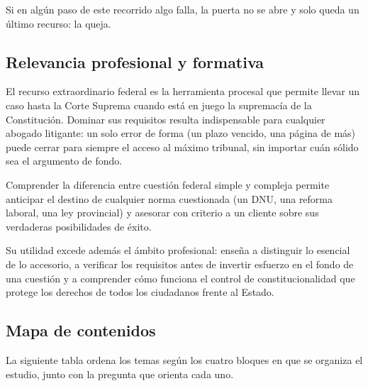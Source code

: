 \documentclass[12pt,oneside]{book}
\begin{document}
Si en algún paso de este recorrido algo falla, la puerta no se abre y solo queda un último recurso: la queja.

\subsection{Relevancia profesional y formativa}

El recurso extraordinario federal es la herramienta procesal que permite llevar un caso hasta la Corte Suprema cuando está en juego la supremacía de la Constitución. Dominar sus requisitos resulta indispensable para cualquier abogado litigante: un solo error de forma (un plazo vencido, una página de más) puede cerrar para siempre el acceso al máximo tribunal, sin importar cuán sólido sea el argumento de fondo.

Comprender la diferencia entre cuestión federal simple y compleja permite anticipar el destino de cualquier norma cuestionada (un DNU, una reforma laboral, una ley provincial) y asesorar con criterio a un cliente sobre sus verdaderas posibilidades de éxito.

Su utilidad excede además el ámbito profesional: enseña a distinguir lo esencial de lo accesorio, a verificar los requisitos antes de invertir esfuerzo en el fondo de una cuestión y a comprender cómo funciona el control de constitucionalidad que protege los derechos de todos los ciudadanos frente al Estado.

\subsection{Mapa de contenidos}

La siguiente tabla ordena los temas según los cuatro bloques en que se organiza el estudio, junto con la pregunta que orienta cada uno.
\end{document}
